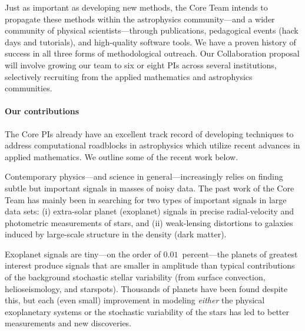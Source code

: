 \documentclass[12pt]{article}
\begin{document}
Just as important as developing new methods, the Core Team intends to
propagate these methods within the astrophysics community---and a wider
community of physical scientists---through publications, pedagogical
events (hack days and tutorials), and high-quality software tools. 
We have a proven history of success in all three forms of methodological outreach.
Our Collaboration proposal will involve growing our team to
six or eight PIs across several institutions, selectively
recruiting from the applied mathematics and astrophysics communities.

\paragraph{Our contributions}

The Core PIs already have an excellent track record of developing
techniques to address computational roadblocks in astrophysics which
utilize recent advances in applied mathematics. We outline some of the
recent work below.

Contemporary physics---and science in general---increasingly relies on
finding subtle but important signals in masses of noisy data.
The past work of the Core Team has mainly been in searching for two
types of important signals in large data sets: (i) extra-solar planet
(exoplanet) signals in precise radial-velocity and photometric
measurements of stars, and (ii) weak-lensing distortions to galaxies
induced by large-scale structure in the density (dark matter).

Exoplanet signals are tiny---on the order of $0.01$~percent---the
planets of greatest interest produce signals that are smaller in
amplitude than typical contributions of the background stochastic
stellar variability (from surface convection, helioseismology, and
starspots).
Thousands of planets have been found despite this, but each (even small)
improvement in modeling \emph{either} the physical exoplanetary systems
or the stochastic variability of the stars has led to better
measurements and new discoveries.
\end{document}

